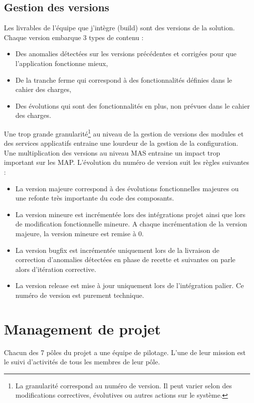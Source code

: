 \documentclass[12pt,a4paper]{article}
\begin{document}
\subsection{Gestion des versions}
Les livrables de l'équipe que j'intègre (build) sont des versions de la solution. Chaque version embarque 3 types de contenu :
\smallbreak
\begin{itemize}
\item Des anomalies détectées sur les versions précédentes et corrigées pour que l’application fonctionne mieux,
\item De la tranche ferme qui correspond à des fonctionnalités définies dans le cahier des charges,
\item Des évolutions qui sont des fonctionnalités en plus, non prévues dans le cahier des charges.
\end{itemize}
\medbreak
Une trop grande granularité\footnote{La granularité correspond au numéro de version. Il peut varier selon des modifications correctives, évolutives ou autres actions sur le système.} au niveau de la gestion de versions des modules et des services applicatifs entraine une lourdeur de la gestion de la configuration. Une multiplication des versions au niveau MAS entraine un impact trop important sur les MAP.
\newpage
\smallbreak
L’évolution du numéro de version suit les règles suivantes :
\smallbreak
\begin{itemize}
\item	La version majeure correspond à des évolutions fonctionnelles majeures ou une refonte très importante du code des composants.
\item	La version mineure est incrémentée lors des intégrations projet ainsi que lors de modification fonctionnelle mineure. A chaque incrémentation de la version majeure, la version mineure est remise à 0. 
\item	La version bugfix est incrémentée uniquement lors de la livraison de correction d’anomalies détectées en phase de recette et suivantes on parle alors d'itération corrective.
\item	La version release est mise à jour uniquement lors de l’intégration palier. Ce numéro de version est purement technique.
\end{itemize}
\medbreak
\clearpage
\newpage
\section{Management de projet}
Chacun des 7 pôles du projet a une équipe de pilotage. L'une de leur mission est le suivi d'activités de tous les membres de leur pôle. 
\end{document}
